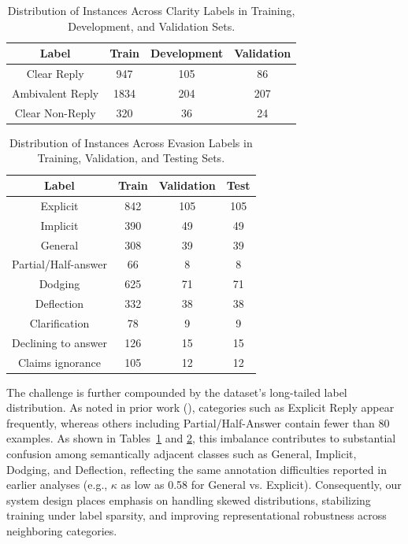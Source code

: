 \documentclass[11pt]{article}
\begin{document}
\begin{table}[h]
\small
\centering
\begin{tabular}{c|ccc}
\toprule
Label              & Train & Development & Validation\\ \midrule
Clear Reply 	& 947 & 105 & 86\\
Ambivalent Reply &	 1834 &	 204 & 207\\
Clear Non-Reply &	 320 	& 36 & 24\\
\bottomrule
\end{tabular}
\caption{Distribution of Instances Across Clarity Labels in Training, Development, and Validation Sets.}
\label{tab:clarity_frequency}
\end{table}


\begin{table}[h]
\small
\centering
\begin{tabular}{c|ccc}
\toprule
Label              & Train & Validation & Test \\ \midrule
Explicit            & 842 & 105 & 105 \\
Implicit            & 390 & 49  & 49 \\
General             & 308 & 39  & 39 \\
Partial/Half-answer & 66  & 8  & 8  \\
Dodging             & 625 & 71  & 71 \\
Deflection          & 332 & 38  & 38 \\
Clarification       & 78  & 9  & 9  \\
Declining to answer & 126 & 15   & 15 \\
Claims ignorance    & 105 & 12   & 12 \\ \hline
\bottomrule
\end{tabular}
\caption{Distribution of Instances Across Evasion Labels in Training, Validation, and Testing Sets.}
\label{tab:evasion_frequency}
\end{table}

The challenge is further compounded by the dataset’s long-tailed label distribution. As noted in prior work (\citealp{thomas2024isaidthatdataset}), categories such as Explicit Reply appear frequently, whereas others including Partial/Half-Answer contain fewer than 80 examples. As shown in Tables~\ref{tab:clarity_frequency} and \ref{tab:evasion_frequency}, this imbalance contributes to substantial confusion among semantically adjacent classes such as General, Implicit, Dodging, and Deflection, reflecting the same annotation difficulties reported in earlier analyses (e.g., $\kappa$ as low as 0.58 for General vs. Explicit). Consequently, our system design places emphasis on handling skewed distributions, stabilizing training under label sparsity, and improving representational robustness across neighboring categories.
\end{document}
